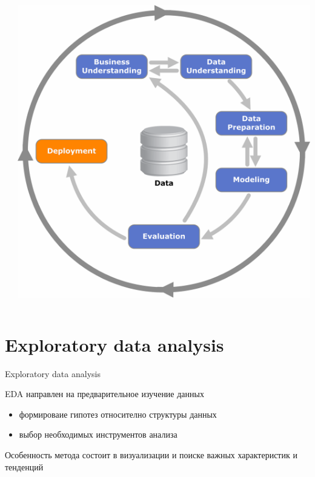 \documentclass[10pt]{beamer}
\begin{document}
\begin{frame}{}

\begin{columns}[C]
    \begin{column}{.5\textwidth}
    	
    \end{column}
       
    \begin{column}{.5\textwidth}
    \vspace{-0em}
	\begin{center}
   		\includegraphics[width=\textwidth]{images/crisp-d.png}
    \end{center}
    \end{column}
  \end{columns}

\end{frame}

\section{Exploratory data analysis}

\begin{frame}{Exploratory data analysis}

EDA направлен на предварительное изучение данных
\begin{itemize}
\item формироваие гипотез относително структуры данных
\item выбор необходимых инструментов анализа
\end{itemize}
Особенность метода состоит в визуализации и поиске важных характеристик и тенденций

\end{frame}
\end{document}
